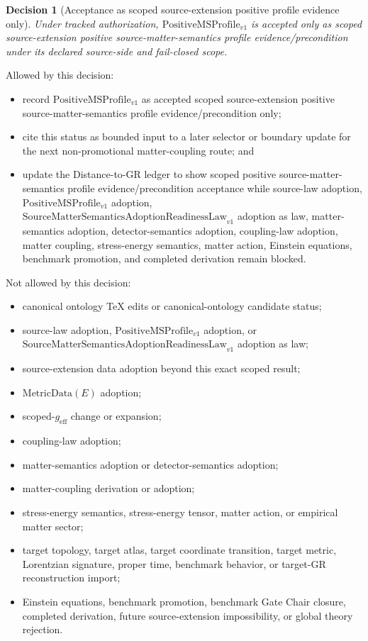 \documentclass[11pt]{article}
\newcommand{\PositiveMSProfile}{\mathrm{PositiveMSProfile}_{v1}}
\newcommand{\SMSAR}{\mathrm{SourceMatterSemanticsAdoptionReadinessLaw}_{v1}}
\newcommand{\MetricData}{\mathrm{MetricData}}
\newcommand{\geff}{g_{\mathrm{eff}}}
\newtheorem{decision}{Decision}
\begin{document}
\begin{decision}[Acceptance as scoped source-extension positive profile evidence only]
Under tracked authorization, \(\PositiveMSProfile\) is accepted only as scoped
source-extension positive source-matter-semantics profile evidence/precondition
under its declared source-side and fail-closed scope.
\end{decision}

Allowed by this decision:
\begin{itemize}[leftmargin=*]
  \item record \(\PositiveMSProfile\) as accepted scoped source-extension
  positive source-matter-semantics profile evidence/precondition only;
  \item cite this status as bounded input to a later selector or boundary
  update for the next non-promotional matter-coupling route; and
  \item update the Distance-to-GR ledger to show scoped positive
  source-matter-semantics profile evidence/precondition acceptance while
  source-law adoption, \(\PositiveMSProfile\) adoption, \(\SMSAR\) adoption
  as law, matter-semantics adoption, detector-semantics adoption, coupling-law
  adoption, matter coupling, stress-energy semantics, matter action, Einstein
  equations, benchmark promotion, and completed derivation remain blocked.
\end{itemize}

Not allowed by this decision:
\begin{itemize}[leftmargin=*]
  \item canonical ontology TeX edits or canonical-ontology candidate status;
  \item source-law adoption, \(\PositiveMSProfile\) adoption, or \(\SMSAR\)
  adoption as law;
  \item source-extension data adoption beyond this exact scoped result;
  \item \(\MetricData(E)\) adoption;
  \item scoped-\(\geff\) change or expansion;
  \item coupling-law adoption;
  \item matter-semantics adoption or detector-semantics adoption;
  \item matter-coupling derivation or adoption;
  \item stress-energy semantics, stress-energy tensor, matter action, or
  empirical matter sector;
  \item target topology, target atlas, target coordinate transition, target
  metric, Lorentzian signature, proper time, benchmark behavior, or target-GR
  reconstruction import;
  \item Einstein equations, benchmark promotion, benchmark Gate Chair closure,
  completed derivation, future source-extension impossibility, or global
  theory rejection.
\end{itemize}
\end{document}

